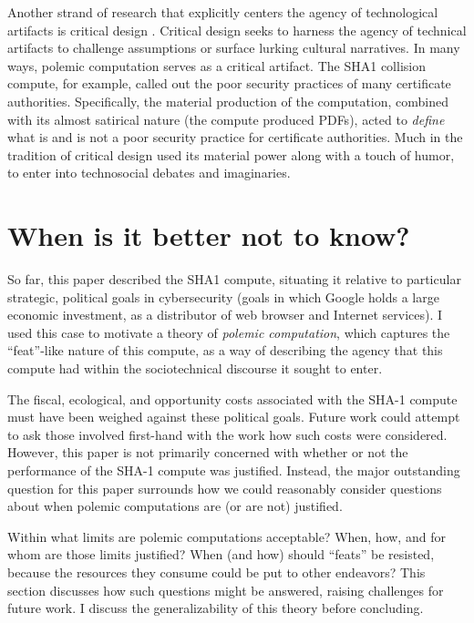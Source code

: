 \documentclass[sigconf]{acmart}
\begin{document}
Another strand of research that explicitly centers the agency of technological artifacts
is critical design \cite{Dunne2001}.
Critical design seeks to harness the agency of technical artifacts 
to challenge assumptions or surface lurking cultural narratives.
In many ways, polemic computation serves as a critical artifact.
The SHA1 collision compute, for example, 
called out the poor security practices of many certificate authorities.
Specifically, the material production of the computation,
combined with its almost satirical nature (the compute produced PDFs),
acted to \emph{define} what is and is not a poor security practice for certificate authorities.
Much in the tradition of critical design
used its material power \cite{Bennett2013a} along with a touch of humor, to enter into technosocial debates and imaginaries.

\section{When is it better not to know?}
\label{sec:org65f24d4}

So far, this paper described the SHA1 compute, situating it relative to particular strategic, political goals in cybersecurity (goals in which Google holds a large economic investment, as a distributor of web browser and Internet services).
I used this case to motivate a theory of \emph{polemic computation}, which captures the ``feat''-like nature of this compute, as a way of describing the agency that this compute had within the sociotechnical discourse it sought to enter.

The fiscal, ecological, and opportunity costs associated with the SHA-1 compute must have been weighed against these political goals. Future work could attempt to ask those involved first-hand with the work how such costs were considered.
However, this paper is not primarily concerned with whether or not the performance of the SHA-1 compute was justified. 
Instead, the major outstanding question for this paper surrounds how we could reasonably consider questions about when polemic computations are (or are not) justified.

Within what limits are polemic computations acceptable?
When, how, and for whom are those limits justified? 
When (and how) should ``feats'' be resisted, because the resources they consume could be put to other endeavors? 
This section discusses how such questions might be answered, raising challenges for future work. 
I discuss the generalizability of this theory before concluding.
\end{document}
